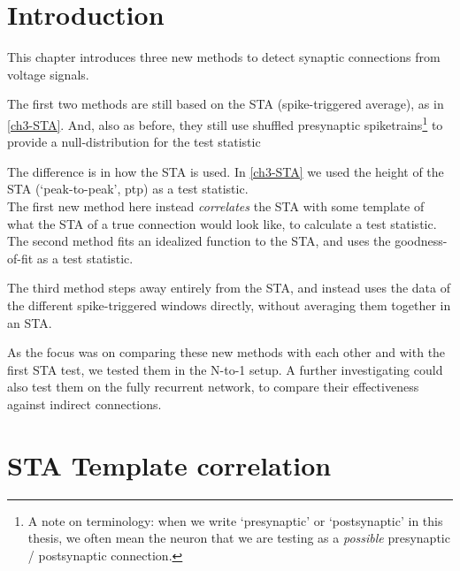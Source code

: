 
\section{Introduction}

This chapter introduces three new methods to detect synaptic connections from voltage signals.

The first two methods are still based on the STA (spike-triggered average), as in \cref{ch3-STA}. And, also as before, they still use shuffled presynaptic spiketrains\footnote{
    A note on terminology: when we write `presynaptic' or `postsynaptic' in this thesis, we often mean the neuron that we are testing as a \emph{possible} presynaptic / postsynaptic connection.
}
to provide a null-distribution for the test statistic

The difference is in how the STA is used. In \cref{ch3-STA} we used the height of the STA (`peak-to-peak', ptp) as a test statistic.\\
The first new method here instead \emph{correlates} the STA with some template of what the STA of a true connection would look like, to calculate a test statistic.\\
The second method fits an idealized function to the STA, and uses the goodness-of-fit as a test statistic.

The third method steps away entirely from the STA, and instead uses the data of the different spike-triggered windows directly, without averaging them together in an STA.

As the focus was on comparing these new methods with each other and with the first STA test, we tested them in the N-to-1 setup. A further investigating could also test them on the fully recurrent network, to compare their effectiveness against indirect connections.


\clearpage
\section{STA Template correlation}


